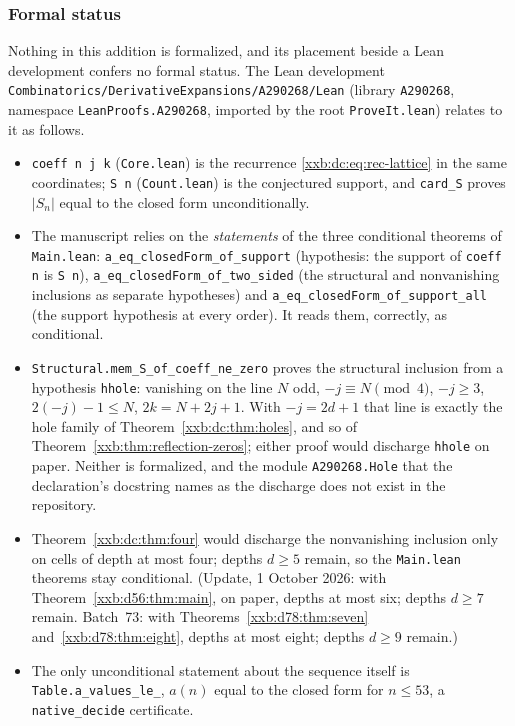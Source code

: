 \documentclass[11pt,a4paper]{article}
\numberwithin{equation}{section}
\theoremstyle{definition}
\theoremstyle{remark}
\theoremstyle{plain}
\begin{document}
\subsubsection{Formal status}\label{xxb:dc:sec:formal}
Nothing in this addition is formalized, and its placement beside a Lean
development confers no formal status.  The Lean development
\texttt{Combinatorics/\allowbreak DerivativeExpansions/\allowbreak A290268/\allowbreak Lean} (library
\texttt{A290268}, namespace \texttt{LeanProofs.A290268}, imported by the root
\texttt{ProveIt.lean}) relates to it as follows.
\begin{itemize}[leftmargin=1.4em,itemsep=1pt]
\item \texttt{coeff n j k} (\texttt{Core.lean}) is the recurrence
 \eqref{xxb:dc:eq:rec-lattice} in the same coordinates; \texttt{S n}
 (\texttt{Count.lean}) is the conjectured support, and \texttt{card\_S} proves
 $|S_n|$ equal to the closed form unconditionally.
\item The manuscript relies on the \emph{statements} of the three conditional
 theorems of \texttt{Main.lean}: \texttt{a\_\allowbreak eq\_\allowbreak closedForm\_\allowbreak of\_\allowbreak support}
 (hypothesis: the support of \texttt{coeff n} is \texttt{S n}),
 \texttt{a\_\allowbreak eq\_\allowbreak closedForm\_\allowbreak of\_\allowbreak two\_\allowbreak sided} (the structural and nonvanishing
 inclusions as separate hypotheses) and
 \texttt{a\_\allowbreak eq\_\allowbreak closedForm\_\allowbreak of\_\allowbreak support\_\allowbreak all} (the support hypothesis at every
 order).  It reads them, correctly, as conditional.
\item \texttt{Structural.mem\_\allowbreak S\_\allowbreak of\_\allowbreak coeff\_\allowbreak ne\_\allowbreak zero} proves the structural
 inclusion from a hypothesis \texttt{hhole}: vanishing on the line $N$ odd,
 $-j\equiv N\pmod4$, $-j\ge3$, $2(-j)-1\le N$, $2k=N+2j+1$.  With $-j=2d+1$
 that line is exactly the hole family of Theorem~\ref{xxb:dc:thm:holes}, and
 so of Theorem~\ref{xxb:thm:reflection-zeros}; either proof would discharge
 \texttt{hhole} on paper.  Neither is formalized, and the module
 \texttt{A290268.Hole} that the declaration's docstring names as the discharge
 does not exist in the repository.
\item Theorem~\ref{xxb:dc:thm:four} would discharge the nonvanishing inclusion
 only on cells of depth at most four; depths $d\ge5$ remain, so the
 \texttt{Main.lean} theorems stay conditional.  (Update, 1 October 2026:
 with Theorem~\ref{xxb:d56:thm:main}, on paper, depths at most six; depths
 $d\ge7$ remain.  Batch~73: with Theorems~\ref{xxb:d78:thm:seven}
 and~\ref{xxb:d78:thm:eight}, depths at most eight; depths $d\ge9$ remain.)
\item The only unconditional statement about the sequence itself is
 \texttt{Table.a\_\allowbreak values\_\allowbreak le\_}, $a(n)$ equal to the closed form for
 $n\le53$, a \texttt{native\_decide} certificate.
\end{itemize}
\end{document}
